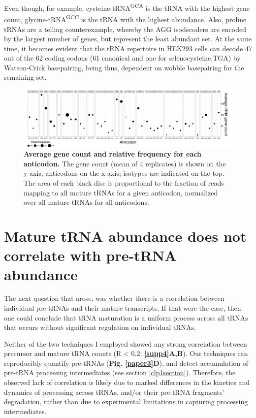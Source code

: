 \documentclass[12pt]{rockefeller}
\newcommand{\super}[1]{\textsuperscript{#1}}
\begin{document}
Even though, for example, cysteine-tRNA\super{GCA} is the tRNA with the highest gene count, glycine-tRNA\super{GCC} is the tRNA with the highest abundance. Also, proline tRNAs are a telling counterexample, whereby the AGG isodecoders are encoded by the largest number of genes, but represent the least abundant set. At the same time, it becomes evident that the tRNA repertoire in HEK293 cells can decode 47 out of the 62 coding codons (61 canonical and one for selenocysteine,TGA) by Watson-Crick basepairing, being thus, dependent on wobble basepairing for the remaining set. 
\bigskip

\begin{figure}[!ht]%
\centering
\includegraphics[width=\textwidth]{paper4D.png}%
\caption[Average gene count and relative frequency for each anticodon.] 
{\textbf{Average gene count and relative frequency for each anticodon.}
The gene count (mean of 4 replicates) is shown on the y-axis, anticodons on the x-axis; isotypes are indicated on the top. The area of each black disc is proportional to the fraction of reads mapping to all mature tRNAs for a given anticodon, normalized over all mature tRNAs for all anticodons.}
\centering
\label{discs}%
\end{figure}

\section{Mature tRNA abundance does not correlate with pre-tRNA abundance}
The next question that arose, was whether there is a correlation between individual pre-tRNAs and their mature transcripts. If that were the case, then one could conclude that tRNA maturation is a uniform process across all tRNAs that occurs without significant regulation on individual tRNAs.

Neither of the two techniques I employed showed any strong correlation between precursor and mature tRNA counts (R < 0.2; \textbf{\ref{supp4}A,B}). Our techniques can reproducibly quantify pre-tRNAs (\textbf{Fig. \ref{paper3}D}), and detect accumulation of pre-tRNA processing intermediates (see section \ref{clp1section}). Therefore, the observed lack of correlation is likely due to marked differences in the kinetics and dynamics of processing across tRNAs, and/or their pre-tRNA fragments' degradation, rather than due to experimental limitations in capturing processing intermediates. 
\end{document}
